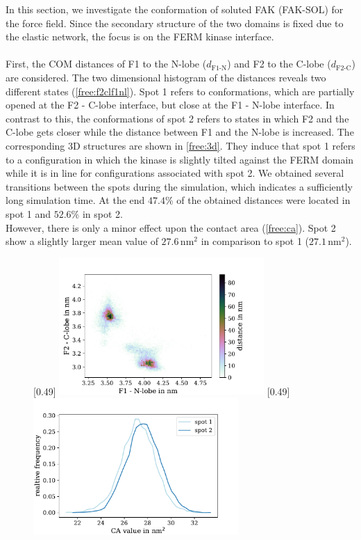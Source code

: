 \label{sec:fak_sol}
In this section, we investigate the conformation of soluted FAK (FAK-SOL) for the \martini{} force field. Since the secondary structure of the two domains is fixed due to the elastic network, the focus is on the FERM kinase interface.\\
\\
First, the COM distances of F1 to the N-lobe ($d_\text{F1-N}$) and F2 to the C-lobe ($d_\text{F2-C}$) are considered. The two dimensional histogram of the distances reveals two different states (\autoref{free:f2clf1nl}). Spot 1 refers to conformations, which are partially opened at the F2 - C-lobe interface, but close at the F1 - N-lobe interface. In contrast to this, the conformations of spot 2 refers to states in which F2 and the C-lobe gets closer while the distance between F1 and the N-lobe is increased. The corresponding 3D structures are shown in \autoref{free:3d}. They induce that spot 1 refers to a configuration in which the kinase is slightly tilted against the FERM domain while it is in line for configurations associated with spot 2. We obtained several transitions between the spots during the simulation, which indicates a sufficiently long simulation time. At the end $47.4\%$ of the obtained distances were located in spot 1 and $52.6\%$ in spot 2.\\
However, there is only a minor effect upon the contact area (\autoref{free:ca}).  Spot 2 show a slightly larger mean value of $27.6\,\si{\nano\metre}^2$ in comparison to spot 1 ($27.1\,\si{\nano\metre}^2$).\\
%
%
%
\begin{figure}
	\subcaptionbox{\label{free:f2clf1nl}}[0.49\textwidth]{
		\includegraphics[height=5.2cm]{figures/results/free_f1f2}
	}\hfill%
	\subcaptionbox{\label{free:ca}}[0.49\textwidth]{
		\includegraphics[height=5.2cm]{figures/results/free_ca}
	}%
\end{figure}
